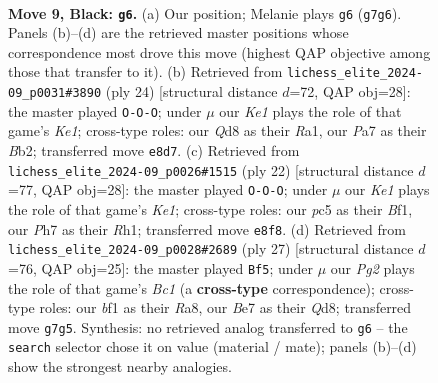 \documentclass[11pt]{article}
\begin{document}
\begin{figure}[p]\centering
\begin{subfigure}{0.46\textwidth}\centering
\resizebox{\linewidth}{!}{%
\newchessgame
\chessboard[
  setfen={rnbqk1r1/pp2bppp/4p3/2Pp3n/3P4/2N5/PP1N1PPP/1RBQKB1R b Kq - 4 9},
  showmover=false,
  pgfstyle=straightmove, color=movearrow, markmove={g7-g6}
]}
\caption{}
\end{subfigure}\hfill
\begin{subfigure}{0.46\textwidth}\centering
\resizebox{\linewidth}{!}{%
\newchessgame
\chessboard[
  setfen={r1bqr1k1/pp2bppp/2p2n2/4p3/2P5/PPNBP3/1BQ2PPP/R3K2R w KQ - 0 13},
  showmover=false,
  pgfstyle=straightmove, color=movearrow, markmove={e1-c1}
]}
\caption{}
\end{subfigure}
\\[4pt]
\begin{subfigure}{0.46\textwidth}\centering
\resizebox{\linewidth}{!}{%
\newchessgame
\chessboard[
  setfen={r2qkb1r/pp1n1ppb/2p1p3/7N/3Pp1PP/4B3/PPPQ1P2/R3KB1R w KQkq - 2 12},
  showmover=false,
  pgfstyle=straightmove, color=movearrow, markmove={e1-c1}
]}
\caption{}
\end{subfigure}\hfill
\begin{subfigure}{0.46\textwidth}\centering
\resizebox{\linewidth}{!}{%
\newchessgame
\chessboard[
  setfen={r1bqr1k1/1p3ppp/2pb4/p1n3P1/4p3/2P1B2P/PPQ1BP2/R3KNNR b KQ - 1 14},
  showmover=false,
  pgfstyle=straightmove, color=movearrow, markmove={c8-f5}
]}
\caption{}
\end{subfigure}
\caption{\textbf{Move 9, Black: \texttt{g6}.} (a) Our position; Melanie plays \texttt{g6} (\texttt{g7g6}). Panels (b)--(d) are the retrieved master positions whose correspondence most drove this move (highest QAP objective among those that transfer to it). (b) Retrieved from \texttt{lichess\_elite\_2024-09\_p0031\#3890} (ply 24) [structural distance $d$=72, QAP obj=28]: the master played \texttt{O-O-O}; under $\mu$ our \emph{Ke1} plays the role of that game's \emph{Ke1}; cross-type roles: our \emph{Q}d8 as their \emph{R}a1, our \emph{P}a7 as their \emph{B}b2; transferred move \texttt{e8d7}. (c) Retrieved from \texttt{lichess\_elite\_2024-09\_p0026\#1515} (ply 22) [structural distance $d$=77, QAP obj=28]: the master played \texttt{O-O-O}; under $\mu$ our \emph{Ke1} plays the role of that game's \emph{Ke1}; cross-type roles: our \emph{p}c5 as their \emph{B}f1, our \emph{P}h7 as their \emph{R}h1; transferred move \texttt{e8f8}. (d) Retrieved from \texttt{lichess\_elite\_2024-09\_p0028\#2689} (ply 27) [structural distance $d$=76, QAP obj=25]: the master played \texttt{Bf5}; under $\mu$ our \emph{Pg2} plays the role of that game's \emph{Bc1} (a \textbf{cross-type} correspondence); cross-type roles: our \emph{b}f1 as their \emph{R}a8, our \emph{B}e7 as their \emph{Q}d8; transferred move \texttt{g7g5}. Synthesis: no retrieved analog transferred to \texttt{g6} -- the \texttt{search} selector chose it on value (material / mate); panels (b)--(d) show the strongest nearby analogies.}
\label{fig:thought-m17}
\end{figure}
\end{document}
